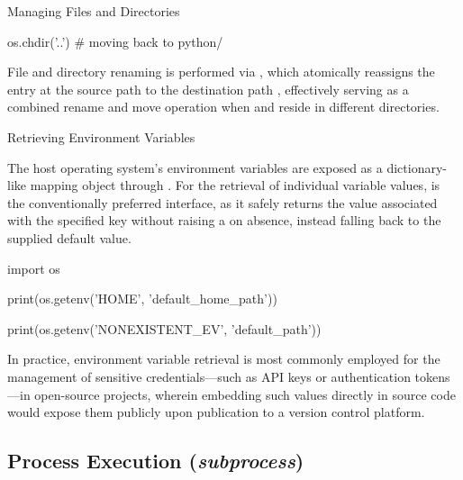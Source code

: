 \documentclass[10pt]{article}
\begin{document}
\begin{core}{Managing Files and Directories}
\begin{pyconsole}
        os.chdir('..') # moving back to python/

      \end{pyconsole}

      File and directory renaming is performed via , which atomically reassigns the entry at the source path  to the destination path , effectively serving as a combined rename and move operation when  and  reside in different directories.

    \end{core}

    \begin{core}{Retrieving Environment Variables}

      The host operating system's environment variables are exposed as a dictionary-like mapping object through . For the retrieval of individual variable values,  is the conventionally preferred interface, as it safely returns the value associated with the specified key without raising a  on absence, instead falling back to the supplied default value.

      \begin{pyconsole}

        import os

        print(os.getenv('HOME', 'default_home_path'))

        print(os.getenv('NONEXISTENT_EV', 'default_path'))

      \end{pyconsole}

      In practice, environment variable retrieval is most commonly employed for the management of sensitive credentials---such as API keys or authentication tokens---in open-source projects, wherein embedding such values directly in source code would expose them publicly upon publication to a version control platform.

    \end{core}

  \subsection{Process Execution (\textit{subprocess})}
\end{document}
